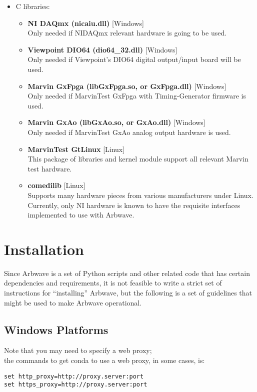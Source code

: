 \begin{itemize}
  \item C libraries:
    \begin{itemize}
    \item \textbf{NI DAQmx (nicaiu.dll)} [Windows] \\
      Only needed if NIDAQmx relevant hardware is going to be used.
    \item \textbf{Viewpoint DIO64 (dio64\_32.dll)} [Windows] \\
      Only needed if Viewpoint's DIO64 digital output/input board will be used.
    \item \textbf{Marvin GxFpga (libGxFpga.so, or GxFpga.dll)} [Windows] \\
      Only needed if MarvinTest GxFpga with  Timing-Generator
      firmware is used.
    \item \textbf{Marvin GxAo (libGxAo.so, or GxAo.dll)} [Windows] \\
      Only needed if MarvinTest GxAo analog output hardware is used.
    \item \textbf{MarvinTest GtLinux} [Linux] \\
      This package of libraries and kernel module support all relevant Marvin
      test hardware.
    \item \textbf{comedilib} [Linux] \\
      Supports many hardware pieces from various manufacturers under Linux.
      Currently, only NI hardware is known to have the requisite interfaces
      implemented to use with Arbwave.
    \end{itemize}
\end{itemize}

\section{Installation}
Since Arbwave is a set of Python scripts and other related code that has certain 
dependencies and requirements,
it is not feasible to write a strict set of instructions for ``installing'' Arbwave,
but the following is a set of guidelines that might be used to make Arbwave operational.

\subsection{Windows Platforms}

Note that you may need to specify a web proxy;\\
the commands to get conda to use a web proxy, in some cases, is:
\begin{verbatim}
set http_proxy=http://proxy.server:port
set https_proxy=http://proxy.server:port
\end{verbatim}


